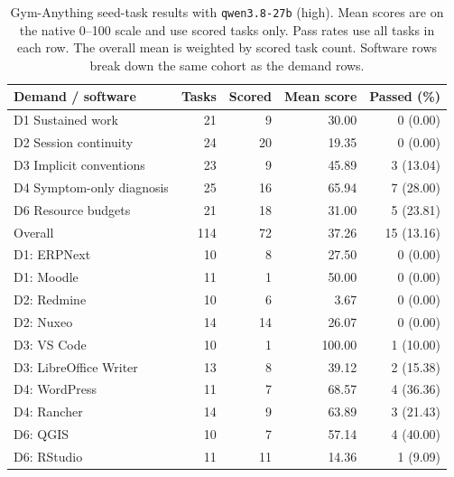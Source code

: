 \documentclass{article} %
\begin{document}
	\begin{table}[htbp]
		\centering
		\caption{Gym-Anything seed-task results with \texttt{qwen3.8-27b}
			(high). Mean scores are on the native 0--100 scale and use scored
			tasks only. Pass rates use all tasks in each row. The overall mean
			is weighted by scored task count. Software rows break down the same
			cohort as the demand rows.}
		\label{tab:gym-anything-qwen-results}
		\small
		\renewcommand{\arraystretch}{1.15}
		\begin{tabular}{@{}lrrrr@{}}
			\toprule
			Demand / software & Tasks & Scored & Mean score & Passed (\%) \\
			\midrule
			D1 Sustained work & 21 & 9 & 30.00 & 0 (0.00) \\
			D2 Session continuity & 24 & 20 & 19.35 & 0 (0.00) \\
			D3 Implicit conventions & 23 & 9 & 45.89 & 3 (13.04) \\
			D4 Symptom-only diagnosis & 25 & 16 & 65.94 & 7 (28.00) \\
			D6 Resource budgets & 21 & 18 & 31.00 & 5 (23.81) \\
			\midrule
			Overall & 114 & 72 & 37.26 & 15 (13.16) \\
			\midrule
			D1: ERPNext & 10 & 8 & 27.50 & 0 (0.00) \\
			D1: Moodle & 11 & 1 & 50.00 & 0 (0.00) \\
			D2: Redmine & 10 & 6 & 3.67 & 0 (0.00) \\
			D2: Nuxeo & 14 & 14 & 26.07 & 0 (0.00) \\
			D3: VS Code & 10 & 1 & 100.00 & 1 (10.00) \\
			D3: LibreOffice Writer & 13 & 8 & 39.12 & 2 (15.38) \\
			D4: WordPress & 11 & 7 & 68.57 & 4 (36.36) \\
			D4: Rancher & 14 & 9 & 63.89 & 3 (21.43) \\
			D6: QGIS & 10 & 7 & 57.14 & 4 (40.00) \\
			D6: RStudio & 11 & 11 & 14.36 & 1 (9.09) \\
			\bottomrule
		\end{tabular}
	\end{table}
\end{document}
